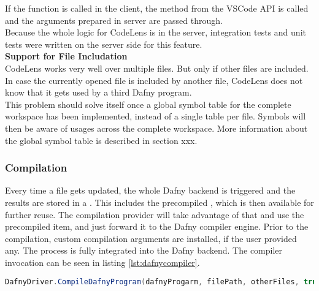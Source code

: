 If the function  is called in the client,
the method  from the VSCode API is called
and the arguments prepared in server are passed through. \\

Because the whole logic for CodeLens is in the server,
integration tests and unit tests were written on the server side for this feature.\\

\textbf{Support for File Includation} \\
CodeLens works very well over multiple files.
But only if other files are included.
In case the currently opened file is included by another file,
CodeLens does not know that it gets used by a third Dafny program. \\

This problem should solve itself once a global symbol table for the complete workspace has been implemented,
instead of a single table per file.
Symbols will then be aware of usages across the complete workspace.
More information about the global symbol table is described in section xxx.


\subsubsection{Compilation}
Every time a file gets updated, the whole Dafny backend is triggered and the results are stored in a .
This includes the precompiled , which is then available for further reuse.
The compilation provider will take advantage of that and use the precompiled item, and just forward it to the Dafny compiler engine.
Prior to the compilation, custom compilation arguments are installed, if the user provided any.
The process is fully integrated into the Dafny backend.
The compiler invocation can be seen in listing \ref{lst:dafnycompiler}.\\

\begin{lstlisting}[language=csharp, caption={Calling the Dafny Compiler}, captionpos=b, label={lst:dafnycompiler}]
DafnyDriver.CompileDafnyProgram(dafnyProgarm, filePath, otherFiles, true, textwriter);
\end{lstlisting}

